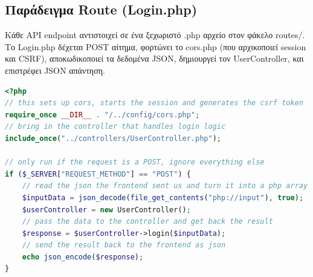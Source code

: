 \documentclass[12pt,a4paper]{report}
\begin{document}
\subsection{Παράδειγμα Route (Login.php)}
Κάθε \textenglish{API endpoint} αντιστοιχεί σε ένα ξεχωριστό \textenglish{.php} αρχείο στον φάκελο \textenglish{routes/}. Το \textenglish{Login.php} δέχεται \textenglish{POST} αίτημα, φορτώνει το \textenglish{cors.php} (που αρχικοποιεί \textenglish{session} και \textenglish{CSRF}), αποκωδικοποιεί τα δεδομένα \textenglish{JSON}, δημιουργεί τον \textenglish{UserController}, και επιστρέφει \textenglish{JSON} απάντηση.
\begin{lstlisting}[language=PHP]
<?php
// this sets up cors, starts the session and generates the csrf token
require_once __DIR__ . "/../config/cors.php";
// bring in the controller that handles login logic
include_once("../controllers/UserController.php");

// only run if the request is a POST, ignore everything else
if ($_SERVER["REQUEST_METHOD"] == "POST") {
    // read the json the frontend sent us and turn it into a php array
    $inputData = json_decode(file_get_contents("php://input"), true);
    $userController = new UserController();
    // pass the data to the controller and get back the result
    $response = $userController->login($inputData);
    // send the result back to the frontend as json
    echo json_encode($response);
}
\end{lstlisting}
\end{document}
